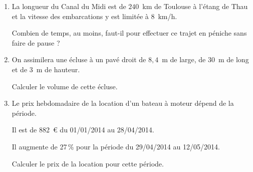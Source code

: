 
\medskip
 
\begin{enumerate}
\item La longueur du Canal du Midi est de $240$~km de Toulouse à l'étang de Thau et la vitesse des embarcations y est limitée à $8$~km/h. 

Combien de temps, au moins, faut-il pour effectuer ce trajet en péniche sans faire de pause ? 
\item On assimilera une écluse à un pavé droit de $8,4$~m de large, de $30$~m de long et de $3$~m de hauteur. 

Calculer le volume de cette écluse. 
\item Le prix hebdomadaire de la location d'un bateau à moteur dépend de la période.
 
Il est de 882~\euro{} du 01/01/2014 au 28/04/2014.
 
Il augmente de 27\,\% pour la période du 29/04/2014 au 12/05/2014.
 
Calculer le prix de la location pour cette période.
\end{enumerate}
 
\vspace{0,5cm}

